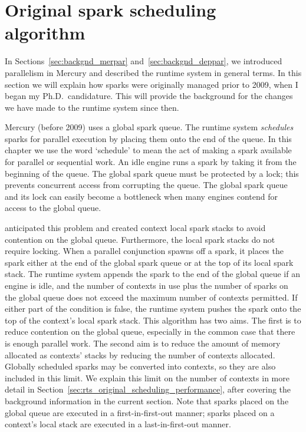 
\section{Original spark scheduling algorithm}
\label{sec:rts_original_scheduling}

In Sections~\ref{sec:backgnd_merpar} and~\ref{sec:backgnd_deppar},
we introduced parallelism in Mercury and described the runtime system in
general terms.
In this section we will explain how sparks were originally managed
prior to 2009,
when I began my Ph.D.\ candidature.
This will provide the background for the changes we have made to the
runtime system since then.

Mercury (before 2009) uses a global spark queue.
The runtime system \emph{schedules} sparks for parallel execution by placing
them onto the end of the queue.
In this chapter we use the word `schedule' to mean the act of making a spark
available for parallel or sequential work.
An idle engine runs a spark by taking it from the beginning of the queue.
The global spark queue must be protected by a lock;
this prevents concurrent access from corrupting the queue.
The global spark queue and its lock can easily become a bottleneck when many
engines contend for access to the global queue.

\citet{wang:2006:hons} anticipated this problem and created context local spark
stacks to avoid contention on the global queue.
Furthermore, the local spark stacks do not require locking.
When a parallel conjunction spawns off a spark,
it places the spark either at the end of the global spark queue or at the
top of its local spark stack.
The runtime system appends the spark to the end of the global queue if
an engine is idle, and
the number of contexts in use plus the number of sparks on the global queue
does not exceed the maximum number of contexts permitted.
If either part of the condition is false,
the runtime system pushes the spark onto the top of the context's local
spark stack.
This algorithm has two aims.
The first is to reduce contention on the global queue,
especially in the common case that there is enough parallel work.
The second aim is to reduce the amount of memory allocated
as contexts' stacks by reducing the number of contexts allocated.
Globally scheduled sparks may be converted into contexts,
so they are also included in this limit.
We explain this limit on the number of contexts in more detail
in Section~\ref{sec:rts_original_scheduling_performance},
after covering the background information in the current section.
Note that sparks placed on the global queue are executed in a
first-in-first-out manner;
sparks placed on a context's local stack are executed in a
last-in-first-out manner.

